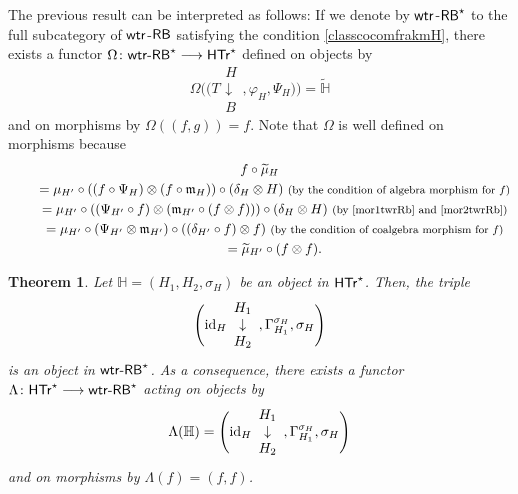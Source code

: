 \documentclass[10pt,a4paper]{amsart}
\numberwithin{equation}{section}
\newtheorem{Theorem}{Theorem}[section]
\begin{document}
The previous result can be interpreted as follows: If we denote by ${\sf wtr}$-${\sf RB}^{\star}$ to the full subcategory of ${\sf wtr}$-${\sf RB}$ satisfying the condition \eqref{classcocomfrakmH}, there exists a functor
$\Omega\colon {\sf wtr}\textnormal{-}{\sf RB}^{\star}\longrightarrow \sf{HTr}^{\star}$
defined on objects by
\[
\Omega\Biggl(\Biggl(T\begin{array}{c}H\\\downarrow\\B\end{array},\varphi_{H},\Psi_{H}\Biggr)\Biggr)=\widetilde{\mathbb{H}}
\]
and on morphisms by $\Omega((f,g))=f$. Note that $\Omega$ is well defined on morphisms because
\begin{gather*}
f\circ\widetilde{\mu}_{H}\\
\qquad{}=\mu_{H'}\circ((f\circ\Psi_{H})\otimes(f\circ\mathfrak{m}_{H}))\circ(\delta_{H}\otimes H)\ \text{\footnotesize\textnormal{(by the condition of algebra morphism for $f$)}}\\
\qquad{}=\mu_{H'}\circ((\Psi_{H'}\circ f)\otimes(\mathfrak{m}_{H'}\circ(f\otimes f)))\circ(\delta_{H}\otimes H)\ \text{\footnotesize\textnormal{(by \eqref{mor1twrRb} and \eqref{mor2twrRb})}}\\
\qquad{}=\mu_{H'}\circ(\Psi_{H'}\otimes\mathfrak{m}_{H'})\circ((\delta_{H'}\circ f)\otimes f)\ \text{\footnotesize\textnormal{(by the condition of coalgebra morphism for $f$)}}\\
\qquad{}=\widetilde{\mu}_{H'}\circ(f\otimes f).
\end{gather*}
\begin{Theorem}\label{funLambda}
Let $\mathbb{H}=(H_{1},H_{2},\sigma_{H})$ be an object in $\sf{HTr}^{\star}$. Then, the triple
\[
\Biggl({\rm id}_{H}\begin{array}{c}H_{1}\\\downarrow\\H_{2}\end{array},\Gamma_{H_{1}}^{\sigma_{H}},\sigma_{H}\Biggr)
\]
 is an object in ${\sf wtr}\textnormal{-}{\sf RB}^{\star}$. As a consequence, there exists a functor
$\Lambda\colon \sf{HTr}^{\star}\longrightarrow {\sf wtr}\textnormal{-}{\sf RB}^{\star}$
acting on objects by
\[
\Lambda(\mathbb{H})=\Biggl({\rm id}_{H}\begin{array}{c}H_{1}\\\downarrow\\H_{2}\end{array},\Gamma_{H_{1}}^{\sigma_{H}},\sigma_{H}\Biggr)
\]
and on morphisms by $\Lambda(f)=(f,f)$.
\end{Theorem}
\end{document}
